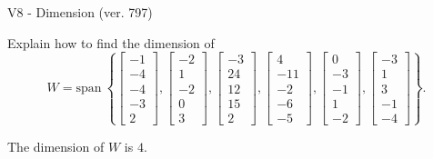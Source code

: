 \begin{exercise}
  \begin{exerciseTitle}V8 - Dimension (ver. 797)\end{exerciseTitle}
  \begin{exerciseStatement}
    Explain how to find the dimension of 
\[W=\mathrm{span}\ \left\{\left[\begin{array}{r}
-1 \\
-4 \\
-4 \\
-3 \\
2
\end{array}\right] , \left[\begin{array}{r}
-2 \\
1 \\
-2 \\
0 \\
3
\end{array}\right] , \left[\begin{array}{r}
-3 \\
24 \\
12 \\
15 \\
2
\end{array}\right] , \left[\begin{array}{r}
4 \\
-11 \\
-2 \\
-6 \\
-5
\end{array}\right] , \left[\begin{array}{r}
0 \\
-3 \\
-1 \\
1 \\
-2
\end{array}\right] , \left[\begin{array}{r}
-3 \\
1 \\
3 \\
-1 \\
-4
\end{array}\right]\right\}.\]



  \end{exerciseStatement}
  \begin{exerciseAnswer}
   The dimension of \(W\) is  \(4\).
  


  \end{exerciseAnswer}
\end{exercise}
